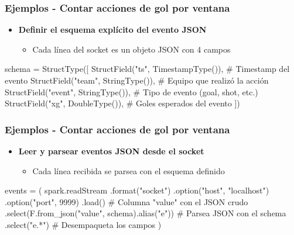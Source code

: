 \documentclass[aspectratio=169]{beamer}
\begin{document}
\begin{frame}[fragile]\frametitle{Ejemplos - Contar acciones de gol por ventana}

\begin{itemize}
	\item \textbf{Definir el esquema explícito del evento JSON}
	\begin{itemize}
		\item Cada línea del socket es un objeto JSON con 4 campos
	\end{itemize}
\end{itemize}

\vspace{1em}

\begin{code}
\begin{python3code}
schema = StructType([
    StructField("ts",    TimestampType()), # Timestamp del evento
    StructField("team",  StringType()),    # Equipo que realizó la acción
    StructField("event", StringType()),    # Tipo de evento (goal, shot, etc.)
    StructField("xg",    DoubleType()),    # Goles esperados del evento
])
\end{python3code}
\end{code}
\end{frame}

\begin{frame}[fragile]\frametitle{Ejemplos - Contar acciones de gol por ventana}

\begin{itemize}
	\item \textbf{Leer y parsear eventos JSON desde el socket}
	\begin{itemize}
		\item Cada línea recibida se parsea con el esquema definido
	\end{itemize}
\end{itemize}

\vspace{1em}

\begin{code}
\begin{python3code}
events = (
    spark.readStream
    .format("socket")
    .option("host", "localhost")
    .option("port", 9999)
    .load()                                          # Columna "value" con el JSON crudo
    .select(F.from_json("value", schema).alias("e")) # Parsea JSON con el schema
    .select("e.*")                                   # Desempaqueta los campos
)
\end{python3code}
\end{code}
\end{frame}
\end{document}
